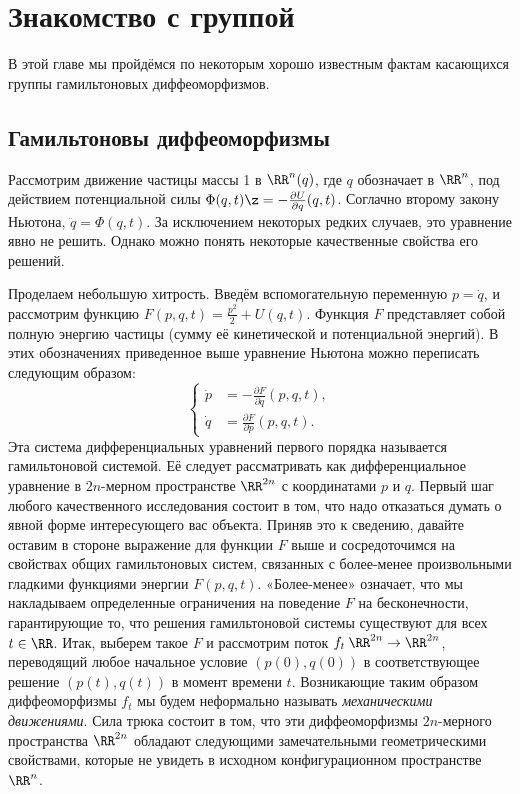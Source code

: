\chapter{Знакомство с группой}

В этой главе мы пройдёмся по некоторым хорошо известным фактам касающихся группы гамильтоновых диффеоморфизмов.

\section[Гамильтоновы диффеоморфизмы]{Гамильтоновы диффеоморфизмы}

Рассмотрим движение частицы массы 1 в $\RR^n(q)$, где $q$ обозначает  в $\RR^n$, под действием потенциальной силы $\Phi(q, t)  \z= - \tfrac{\partial U}{\partial q} (q, t)$.
Соглачно второму закону Ньютона, $\ddot q= \Phi (q, t)$.
За исключением некоторых редких случаев, это уравнение явно не решить.
Однако можно понять некоторые качественные свойства его решений.

Проделаем небольшую хитрость.
Введём вспомогательную переменную $p = \dot q$, и рассмотрим функцию $F(p,q,t)= \tfrac {p^2} 2 + U (q, t)$.
Функция $F$ представляет собой полную энергию частицы (сумму её кинетической и потенциальной энергий).
В этих обозначениях приведенное выше уравнение Ньютона можно переписать следующим образом:
\[
\begin{cases}
\dot p &= - \tfrac{\partial F}{\partial q} (p, q, t),\\
\dot q &= \tfrac{\partial F}{\partial p} (p, q, t).
\end{cases}
\]
Эта система дифференциальных уравнений первого порядка называется гамильтоновой системой.
Её следует рассматривать как дифференциальное уравнение в $2n$-мерном пространстве $\RR^{2n}$ с координатами $p$ и $q$.
Первый шаг любого качественного исследования состоит в том, что надо отказаться думать о явной форме интересующего вас объекта.
Приняв это к сведению, давайте оставим в стороне выражение для функции $F$ выше и сосредоточимся на свойствах общих гамильтоновых систем, связанных с более-менее произвольными гладкими функциями энергии $F (p, q, t)$.
«Более-менее» означает, что мы накладываем определенные ограничения на поведение $F$ на бесконечности, гарантирующие то, что решения гамильтоновой системы существуют для всех $t\in \RR$.
Итак, выберем такое $F$ и рассмотрим поток $f_t\: \RR^{2n} \to \RR^{2n}$, переводящий любое начальное условие $(p(0),q(0))$ в соответствующее решение $(p (t), q (t))$ в момент времени $t$.
Возникающие таким образом диффеоморфизмы $f_t$ мы будем неформально называть \emph{механическими движениями}.
Сила трюка состоит в том, что эти диффеоморфизмы $2n$-мерного пространства $\RR^{2n}$ обладают следующими замечательными геометрическими свойствами, которые не увидеть в исходном конфигурационном пространстве $\RR^n$.

